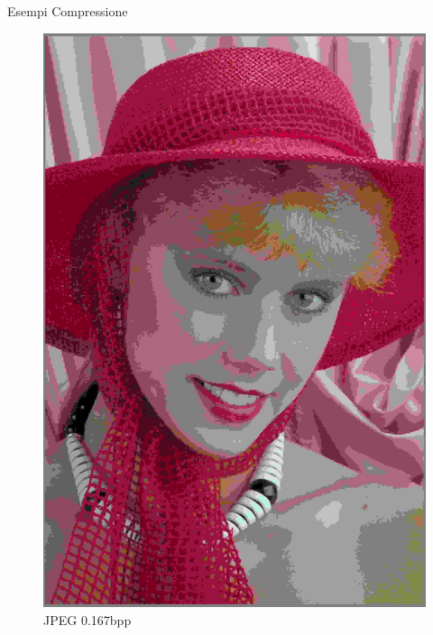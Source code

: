 \begin{frame}{Esempi Compressione}
\begin{figure}[!ht]
            \begin{minipage}[]{0.13\linewidth}
                \centering
                \includegraphics[width=\textwidth]{Immagini/IMAGES/JPEG_1_IMG0004.pdf}
                \caption{JPEG 0.167bpp}
                \label{fig:ExampleJPEG}
            \end{minipage}
            \begin{minipage}[]{0.13\linewidth}
                \centering

\end{minipage}
\end{figure}
\end{frame}
